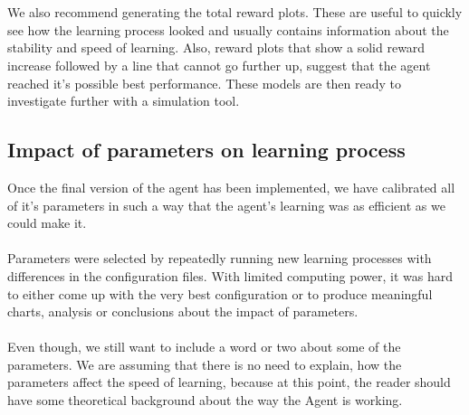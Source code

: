 \documentclass{article}
\begin{document}
\\\\
We also recommend generating the total reward plots. These are useful to quickly see how the learning process looked and usually contains information about the stability and speed of learning. Also, reward plots that show a solid reward increase followed by a line that cannot go further up, suggest that the agent reached it's possible best performance. These models are then ready to investigate further with a simulation tool.  

\subsection{Impact of parameters on learning process}
Once the final version of the agent has been implemented, we have calibrated all of it's parameters in such a way that the agent's learning was as efficient as we could make it.
\\\\
Parameters were selected by repeatedly running new learning processes with differences in the configuration files. With limited computing power, it was hard to either come up with the very best configuration or to produce meaningful charts, analysis or conclusions about the impact of parameters.
\\\\
Even though, we still want to include a word or two about some of the parameters. We are assuming that there is no need to explain, how the parameters affect the speed of learning, because at this point, the reader should have some theoretical background about the way the Agent is working. 
\end{document}

